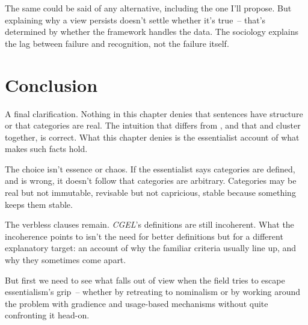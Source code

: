 The same could be said of any alternative, including the one I'll propose. But explaining why a view persists doesn't settle whether it's true~-- that's determined by whether the framework handles the data. The sociology explains the lag between failure and recognition, not the failure itself.

\section{Conclusion}
\label{sec:2:conclusion}

A final clarification. Nothing in this chapter denies that sentences have structure or that categories are real. The intuition that  differs from , and that  and  cluster together, is correct. What this chapter denies is the essentialist account of what makes such facts hold.

The choice isn't essence or chaos. If the essentialist says categories are defined, and is wrong, it doesn't follow that categories are arbitrary. Categories may be real but not immutable, revisable but not capricious, stable because something keeps them stable.

The verbless clauses remain. \textit{CGEL}'s definitions are still incoherent. What the incoherence points to isn't the need for better definitions but for a different explanatory target: an account of why the familiar criteria usually line up, and why they sometimes come apart.

But first we need to see what falls out of view when the field tries to escape essentialism's grip~-- whether by retreating to nominalism or by working around the problem with gradience and usage-based mechanisms without quite confronting it head-on.
